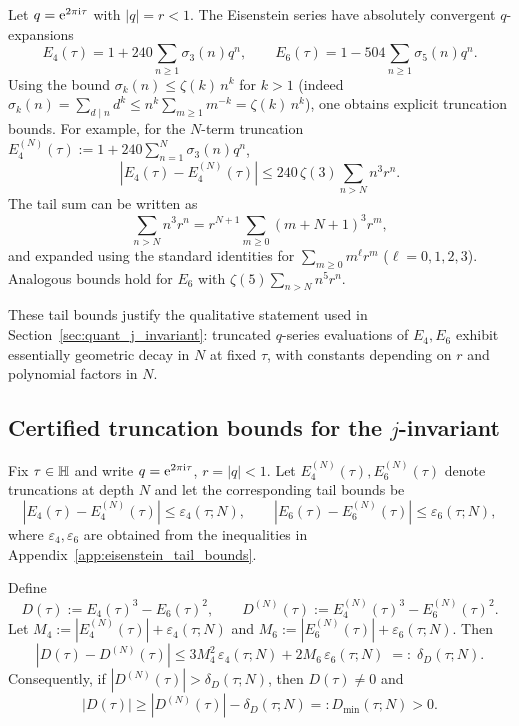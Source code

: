 Let $q=\mathrm{e}^{2\pi\mathrm{i}\tau}$ with $|q|=r<1$. The Eisenstein series have absolutely convergent $q$-expansions
\begin{equation}
E_4(\tau)=1+240\sum_{n\ge 1}\sigma_3(n)q^n,\qquad
E_6(\tau)=1-504\sum_{n\ge 1}\sigma_5(n)q^n.
\end{equation}
Using the bound $\sigma_k(n)\le \zeta(k)\,n^k$ for $k>1$ (indeed $\sigma_k(n)=\sum_{d\mid n}d^k\le n^k\sum_{m\ge 1}m^{-k}=\zeta(k)\,n^k$), one obtains explicit truncation bounds. For example, for the $N$-term truncation $E_4^{(N)}(\tau):=1+240\sum_{n=1}^{N}\sigma_3(n)q^n$,
\begin{equation}
|E_4(\tau)-E_4^{(N)}(\tau)|
\le 240\,\zeta(3)\sum_{n>N} n^3 r^n.
\end{equation}
The tail sum can be written as
\begin{equation}
\sum_{n>N} n^3 r^n
=r^{N+1}\sum_{m\ge 0}(m+N+1)^3 r^m,
\end{equation}
and expanded using the standard identities for $\sum_{m\ge 0} m^\ell r^m$ ($\ell=0,1,2,3$). Analogous bounds hold for $E_6$ with $\zeta(5)\sum_{n>N} n^5 r^n$.

These tail bounds justify the qualitative statement used in Section~\ref{sec:quant_j_invariant}: truncated $q$-series evaluations of $E_4,E_6$ exhibit essentially geometric decay in $N$ at fixed $\tau$, with constants depending on $r$ and polynomial factors in $N$.

\subsection{Certified truncation bounds for the \texorpdfstring{$j$}{j}-invariant}
\label{app:j_truncation_bounds}

Fix $\tau\in\mathbb{H}$ and write $q=\mathrm{e}^{2\pi\mathrm{i}\tau}$, $r=|q|<1$. Let $E_4^{(N)}(\tau),E_6^{(N)}(\tau)$ denote truncations at depth $N$ and let the corresponding tail bounds be
\begin{equation}
|E_4(\tau)-E_4^{(N)}(\tau)|\le \varepsilon_4(\tau;N),\qquad
|E_6(\tau)-E_6^{(N)}(\tau)|\le \varepsilon_6(\tau;N),
\end{equation}
where $\varepsilon_4,\varepsilon_6$ are obtained from the inequalities in Appendix~\ref{app:eisenstein_tail_bounds}.

Define
\begin{equation}
D(\tau):=E_4(\tau)^3-E_6(\tau)^2,\qquad
D^{(N)}(\tau):=E_4^{(N)}(\tau)^3-E_6^{(N)}(\tau)^2.
\end{equation}
Let $M_4:=|E_4^{(N)}(\tau)|+\varepsilon_4(\tau;N)$ and $M_6:=|E_6^{(N)}(\tau)|+\varepsilon_6(\tau;N)$. Then
\begin{equation}
|D(\tau)-D^{(N)}(\tau)|
\le 3M_4^2\,\varepsilon_4(\tau;N) + 2M_6\,\varepsilon_6(\tau;N)
\;=:\;\delta_D(\tau;N).
\end{equation}
Consequently, if $|D^{(N)}(\tau)|>\delta_D(\tau;N)$, then $D(\tau)\neq 0$ and
\begin{equation}
|D(\tau)|\ge |D^{(N)}(\tau)|-\delta_D(\tau;N)=:D_{\min}(\tau;N)>0.
\end{equation}

